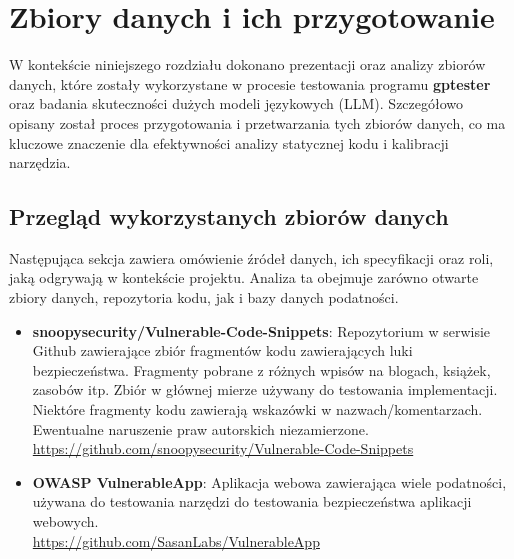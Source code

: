 \chapter{Zbiory danych i ich przygotowanie}
\label{ch:zbiory_danych}

W kontekście niniejszego rozdziału dokonano prezentacji oraz analizy zbiorów danych, które zostały wykorzystane w procesie testowania programu \textbf{gptester} oraz badania skuteczności dużych modeli językowych (LLM). Szczegółowo opisany został proces przygotowania i przetwarzania tych zbiorów danych, co ma kluczowe znaczenie dla efektywności analizy statycznej kodu i kalibracji narzędzia.


\section{Przegląd wykorzystanych zbiorów danych}
\label{sec:przeglad_zbiorow}

Następująca sekcja zawiera omówienie źródeł danych, ich specyfikacji oraz roli, jaką odgrywają w kontekście projektu. Analiza ta obejmuje zarówno otwarte zbiory danych, repozytoria kodu, jak i bazy danych podatności.


\begin{itemize}
    \item \textbf{snoopysecurity/Vulnerable-Code-Snippets}: Repozytorium w serwisie Github zawierające zbiór fragmentów kodu zawierających luki bezpieczeństwa. Fragmenty pobrane z różnych wpisów na blogach, książek, zasobów itp. 
    Zbiór w głównej mierze używany do testowania implementacji. Niektóre fragmenty kodu zawierają wskazówki w nazwach/komentarzach. Ewentualne naruszenie praw autorskich niezamierzone.\\ \url{https://github.com/snoopysecurity/Vulnerable-Code-Snippets}

    \item \textbf{OWASP VulnerableApp}: Aplikacja webowa zawierająca wiele podatności, używana do testowania narzędzi do testowania bezpieczeństwa aplikacji webowych. \\ \url{https://github.com/SasanLabs/VulnerableApp}
\end{itemize}

